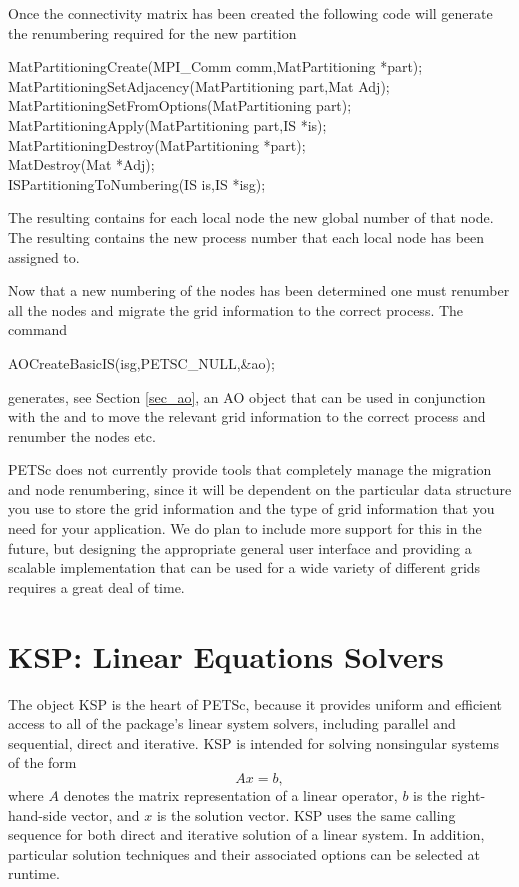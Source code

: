Once the connectivity matrix has been created the following code will
generate the renumbering required for the new partition
\begin{tabbing}
 MatPartitioningCreate(MPI\_Comm comm,MatPartitioning *part);\\
 MatPartitioningSetAdjacency(MatPartitioning part,Mat Adj);\\
 MatPartitioningSetFromOptions(MatPartitioning part);\\
 MatPartitioningApply(MatPartitioning part,IS *is);\\
 MatPartitioningDestroy(MatPartitioning *part); \\
 MatDestroy(Mat *Adj);\\
 ISPartitioningToNumbering(IS is,IS *isg);
\end{tabbing}
The resulting  contains for each local node the new global
number of that node. The resulting  contains the new process number
that each local node has been assigned to.

Now that a new numbering of the nodes has been determined one must 
renumber all the nodes and migrate the grid information to the correct process.
The command
\begin{tabbing}
 AOCreateBasicIS(isg,PETSC_NULL,\&ao);
\end{tabbing}
generates, see Section \ref{sec_ao}, an AO object that can be used in conjunction with the
 and  to move the relevant grid information to the correct process
and renumber the nodes etc. 

PETSc does not currently provide tools that completely manage the migration and 
node renumbering, since it will be dependent on the particular data structure you 
use to store the grid information and the type of grid information that you need
for your application. We do plan to include more support for this in the future,
but designing the appropriate general user interface and providing a scalable
implementation that can be used for a wide variety of different grids requires a
great deal of time.

 


\cleardoublepage
\chapter{KSP: Linear Equations Solvers} 
\label{ch_ksp}

The object KSP is the heart of PETSc, because it provides uniform and efficient access 
to all of the package's linear system solvers, including parallel and sequential,
direct and iterative.
KSP is intended for solving nonsingular systems of the form
\begin{equation}
   A x = b,
\label{eq_Ax=b}
\end{equation}
where $ A$ denotes the matrix representation of a linear operator, $b$
is the right-hand-side vector, and $ x $ is the solution vector.  KSP
uses the same calling sequence for both direct and iterative solution
of a linear system.  In addition, particular solution techniques and
their associated options can be selected at runtime.

